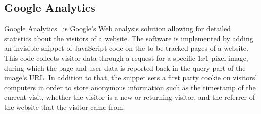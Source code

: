 \documentclass[10pt,twocolumn,letterpaper]{article}
\begin{document}
\subsection{Google Analytics}
Google Analytics~\cite{googleanalytics} is Google's Web analysis solution allowing for detailed statistics about the visitors of a website. The software is implemented by adding an invisible snippet of JavaScript code on the to-be-tracked pages of a website. This code collects visitor data through a request for a specific $1x1$ pixel image, during which the page and user data is reported back in the query part of the image's URL. In addition to that, the snippet sets a first party cookie on visitors' computers in order to store anonymous information such as the timestamp of the current visit, whether the visitor is a new or returning visitor, and the referrer of the website that the visitor came from.
\end{document}
